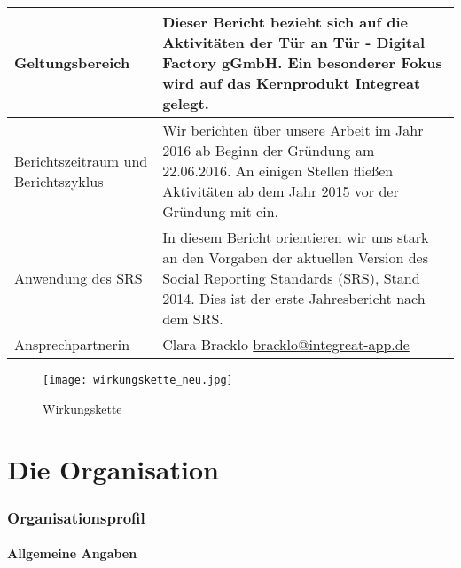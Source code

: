 \documentclass[12pt, a4paper]{article} %
\begin{document}
\begin{table}[!h]
\centering
\label{table1}
\begin{tabular}{|p{4cm}|p{10 cm}|}
\hline
Geltungsbereich                     & Dieser Bericht bezieht sich auf die Aktivitäten der Tür an Tür - Digital Factory gGmbH. Ein besonderer Fokus wird auf das Kernprodukt Integreat gelegt.\\ \hline
Berichtszeitraum und Berichtszyklus & Wir berichten über unsere Arbeit im Jahr 2016 ab Beginn der Gründung am 22.06.2016. An einigen Stellen fließen Aktivitäten ab dem Jahr 2015 vor der Gründung mit ein.\\ \cline{1-2}
Anwendung des SRS                   & In diesem Bericht orientieren wir uns stark an den Vorgaben der aktuellen Version des Social Reporting Standards (SRS), Stand 2014. Dies ist der erste Jahresbericht nach dem SRS.\\ \cline{1-2} \hline
Ansprechpartnerin                     & Clara Bracklo \href{mailto:bracklo@integreat-app.de}{bracklo@integreat-app.de}\\ \hline
\end{tabular}
\end{table}


\begin{figure} [!h]
    \centering
	\texttt{[image: wirkungskette\_neu.jpg]} %
	\caption{Wirkungskette} %
	\label{fig:wirkungskette} %
\end{figure}

\part{Die Organisation}
\section{Organisationsprofil}
\subsection{Allgemeine Angaben}
\end{document}
